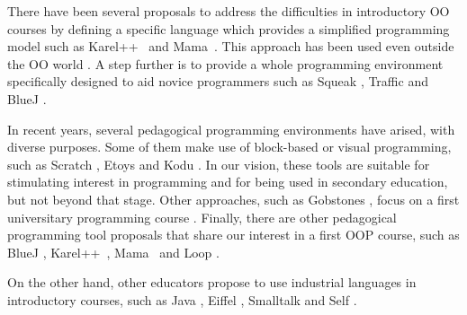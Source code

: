 


There have been several proposals to address the difficulties in introductory OO courses 
by defining a specific language which provides a simplified programming model such as Karel++~\cite{bergin_karel++:_1996} and Mama~\cite{harrisonmama}.
This approach has been used even outside the OO world \cite{feurzeig_programming-languages_1970, pattis_karel_1981, lopez_nombre_2012}.
A step further is to provide a whole programming environment specifically designed to aid novice programmers 
such as Squeak \cite{ingalls_back_1997}, Traffic \cite{broy_outside-method_2003} and BlueJ \cite{bennedsen_bluej_2010}. 



In recent years, several pedagogical programming environments have arised, with diverse purposes.
Some of them make use of block-based or visual programming, 
such as Scratch \cite{malan_scratch_2007}, Etoys \cite{lee_empowering_2011} and Kodu \cite{kodu}. 
In our vision, these tools are suitable for stimulating interest in programming and for being used in secondary education, but not beyond that stage.
Other approaches, such as Gobstones \cite{lopez_nombre_2012}, focus on a first universitary programming course%
.
Finally, there are other pedagogical programming tool proposals that share our interest in a first OOP course, 
such as BlueJ \cite{bennedsen_bluej_2010}, Karel++~\cite{bergin_karel++:_1996}, Mama~\cite{harrisonmama} and Loop \cite{griggio_programming_2011}.

On the other hand, other educators propose to use industrial languages in introductory courses, 
such as Java \cite{kolling2001guidelines}, Eiffel \cite{meyer1993towards, broy_outside-method_2003}, Smalltalk \cite{ducasse2006squeak} and Self \cite{Unga87a}.


